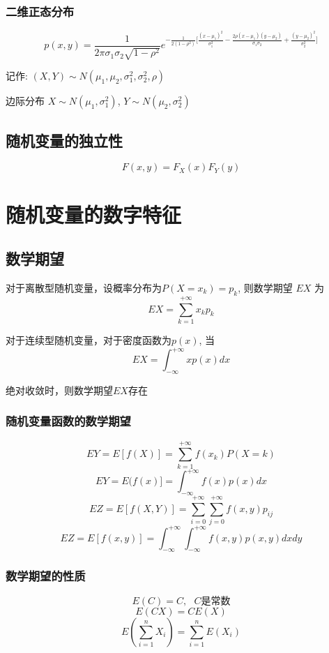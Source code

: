 \documentclass[10pt, a4paper]{article}
\begin{document}
        \subsubsection{二维正态分布}
            $$
                p(x, y) = \frac{1}{2\pi\sigma_1\sigma_2\sqrt{1 - \rho^2}}e^{-\frac{1}{2(1 - \rho^2)}\lbrack\frac{(x - \mu_1)^2}{\sigma_1^2} - \frac{2\rho(x - \mu_1)(y - \mu_2)}{\sigma_1\sigma_2} + \frac{(y - \mu_2)^2}{\sigma_2^2}\rbrack}
            $$

            记作: $(X, Y) \sim N(\mu_1, \mu_2, \sigma_1^2, \sigma_2^2, \rho)$

            边际分布 $X \sim N(\mu_1, \sigma_1^2)$, $Y \sim N(\mu_2, \sigma_2^2)$
        \subsection{随机变量的独立性}
            $$F(x, y) = F_X(x)F_Y(y)$$
            \newpage 

\newpage
\section{随机变量的数字特征}
    \subsection{数学期望}
        对于离散型随机变量，设概率分布为$P(X = x_k) = p_k$, 则数学期望 $EX$ 为
        $$EX = \sum_{k = 1}^{+\infty}x_kp_k$$

        对于连续型随机变量，对于密度函数为$p(x)$, 当
        $$EX = \int_{-\infty}^{+\infty}xp(x)dx$$
      
        绝对收敛时，则数学期望$EX$存在
    
    \subsubsection{随机变量函数的数学期望}
        $$EY = E[f(X)] = \sum_{k = 1}^{+\infty}f(x_k)P(X = k)$$
        $$EY = E(f(x)] = \int_{-\infty}^{+\infty}f(x)p(x)dx $$
        $$EZ = E[f(X, Y)] = \sum_{i = 0}^{+\infty}\sum_{j = 0}^{+\infty}f(x, y)p_{ij}$$
        $$EZ = E[f(x, y)] = \int_{-\infty}^{+\infty}\int_{-\infty}^{+\infty}f(x, y)p(x, y)dxdy$$

    \subsubsection{数学期望的性质}
    $$E(C) = C, \text{ $C$是常数}$$
    $$E(CX) = CE(X)$$
    $$E(\sum_{i = 1}^nX_i) = \sum_{i = 1}^nE(X_i)$$
    
\end{document}
